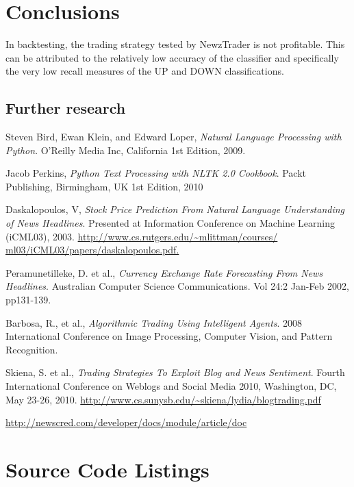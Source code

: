 \documentclass[]{article}
\begin{document}
\section{Conclusions}
In backtesting, the trading strategy tested by NewzTrader is not profitable.  This can be attributed to the relatively low accuracy of the classifier and specifically the very low recall measures of the UP and DOWN classifications.  

\subsection{Further research}



\begin{thebibliography}{9}

  Steven Bird, Ewan Klein, and Edward Loper,
  \emph{Natural Language Processing with Python}.
  O'Reilly Media Inc, California
  1st Edition,
  2009.

  Jacob Perkins,
  \emph{Python Text Processing with NLTK 2.0 Cookbook}.
  Packt Publishing, Birmingham, UK
  1st Edition,
  2010

  Daskalopoulos, V,
  \emph{Stock Price Prediction From Natural Language Understanding of News Headlines}.
  Presented at Information Conference on Machine Learning (iCML03), 2003. 
  \url{http://www.cs.rutgers.edu/~mlittman/courses/ ml03/iCML03/papers/daskalopoulos.pdf.}

  Peramunetilleke, D. et al., 
  \emph{Currency Exchange Rate Forecasting From News Headlines}.
  Australian Computer Science Communications.
  Vol 24:2 Jan-Feb 2002,
  pp131-139.

  Barbosa, R., et al.,
  \emph{Algorithmic Trading Using Intelligent Agents}.
  2008 International Conference on Image Processing, Computer Vision, and Pattern Recognition.

  Skiena, S. et al.,
  \emph{Trading Strategies To Exploit Blog and News Sentiment}.
  Fourth International Conference on Weblogs and Social Media 2010,
  Washington, DC, May 23-26, 2010. 
  \url{http://www.cs.sunysb.edu/~skiena/lydia/blogtrading.pdf}

\url{http://newscred.com/developer/docs/module/article/doc}

\end{thebibliography}
\section{Source Code Listings}
\end{document}
